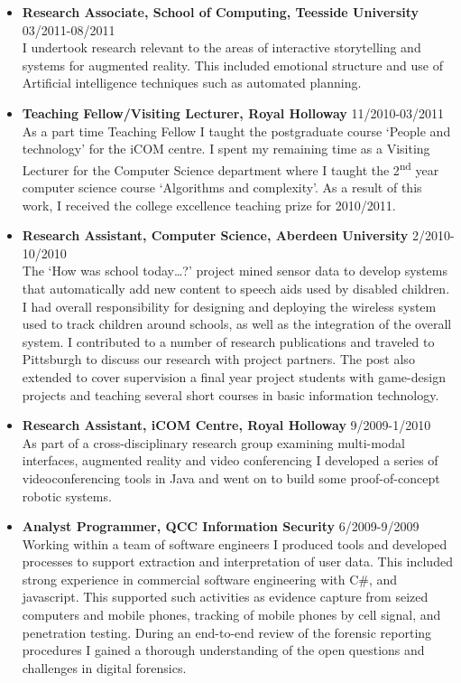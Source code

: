 \documentclass[10pt]{article}
\newenvironment{outerlist}[1][\enskip\textbullet]%
        {\begin{itemize}[#1]}{\end{itemize}%
         \vspace{-.6\baselineskip}}
\begin{document}
\begin{outerlist}
\item[] {\bf  Research Associate, School of Computing, Teesside University} \hfill 03/2011-08/2011 \\
I undertook research relevant to the areas of interactive storytelling and systems for augmented reality. This included emotional structure and use of Artificial intelligence techniques such as automated planning.

\item[] {\bf Teaching Fellow/Visiting Lecturer, Royal Holloway} \hfill 11/2010-03/2011 \\
As a part time Teaching Fellow  I taught the postgraduate course `People and technology' for the iCOM centre.  I spent my remaining time as a Visiting Lecturer for the Computer Science department where I taught the 2\textsuperscript{nd} year computer science course `Algorithms and complexity'. As a result of this work, I received the college excellence teaching prize for 2010/2011. 

\item[] {\bf Research Assistant, Computer Science, Aberdeen University} \hfill {2/2010-10/2010}\\
    The `How was school today\ldots?' project  mined sensor data to develop systems that automatically add new content to speech aids used by disabled children. I had overall responsibility for designing and deploying the wireless system used to track children around schools, as well as the integration of the overall system.  I contributed to a number of research publications and traveled to Pittsburgh to discuss our research with project partners. The post also extended to cover supervision a final year project students with game-design projects and teaching several short courses in basic information technology. 
    

\item[] {\bf Research Assistant, iCOM Centre, Royal Holloway}
\hfill 9/2009-1/2010\\
As part of a cross-disciplinary research group examining multi-modal interfaces, augmented reality and video conferencing I developed a series of  videoconferencing tools in Java and went on to build  some proof-of-concept robotic systems.  

\item[] {\bf Analyst Programmer, QCC Information Security} \hfill {6/2009-9/2009}\\
Working within a team of software engineers I produced tools and developed processes to support extraction and interpretation of user data. This included strong experience in commercial software engineering with C\#,  and javascript.  This supported such activities as evidence capture from seized computers and mobile phones, tracking of mobile phones by cell signal, and penetration testing.  During an end-to-end review of the forensic reporting procedures I gained a thorough understanding of the open questions and challenges in digital forensics.  


\end{outerlist}
\end{document}
